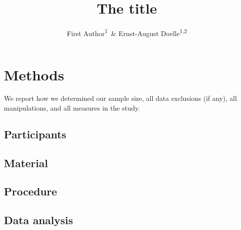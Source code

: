\documentclass[
  english,
  man]{apa6}
\author{First Author\textsuperscript{1}\ \& Ernst-August Doelle\textsuperscript{1,2}}
\affiliation{
\vspace{0.5cm}
\textsuperscript{1} Wilhelm-Wundt-University\\\textsuperscript{2} Konstanz Business School}
\title{The title}
\date{}
\begin{document}
\maketitle

\hypertarget{methods}{%
\section{Methods}\label{methods}}

We report how we determined our sample size, all data exclusions (if any), all manipulations, and all measures in the study.

\hypertarget{participants}{%
\subsection{Participants}\label{participants}}

\hypertarget{material}{%
\subsection{Material}\label{material}}

\hypertarget{procedure}{%
\subsection{Procedure}\label{procedure}}

\hypertarget{data-analysis}{%
\subsection{Data analysis}\label{data-analysis}}
\end{document}
